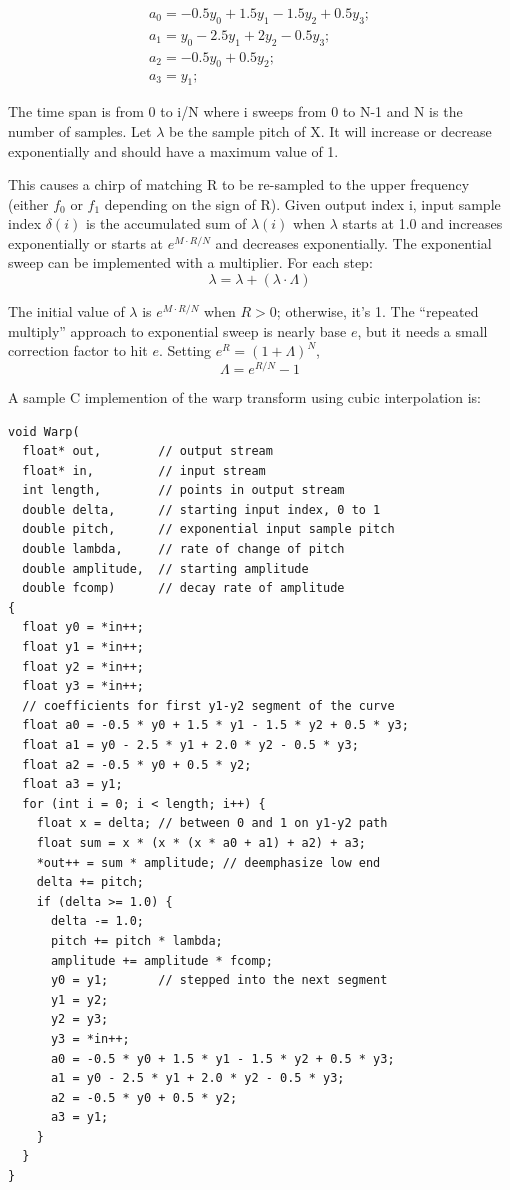 \begin{gather*} 
a_0 = -0.5y_0 + 1.5y_1 - 1.5y_2 + 0.5y_3;\\
a_1 = y_0 - 2.5y_1 + 2y_2 - 0.5y_3;\\
a_2 = -0.5y_0 + 0.5y_2;\\
a_3 = y_1;
\end{gather*}

The time span is from 0 to i/N where i sweeps from 0 to N-1 and N is the number
of samples.
Let $\lambda$ be the sample pitch of X.
It will increase or decrease exponentially and should have a maximum value of 1.

This causes a chirp of matching R to be re-sampled to the upper frequency
(either $f_0$ or $f_1$ depending on the sign of R).
Given output index i, input sample index $\delta(i)$ is the accumulated sum of
$\lambda(i)$ when $\lambda$ starts at 1.0 and increases exponentially
or starts at $e^{M \cdot R/N}$ and decreases exponentially.
The exponential sweep can be implemented with a multiplier.
For each step:
\begin{equation}  \label{eq:lambda}
\lambda = \lambda + (\lambda\cdot\Lambda)
\end{equation}

The initial value of $\lambda$ is $e^{M \cdot R/N}$ when $R>0$; otherwise, it's 1.
The ``repeated multiply'' approach to exponential sweep is nearly base $e$,
but it needs a small correction factor to hit $e$.
Setting $e^R = (1 + \Lambda)^N$,
\begin{equation}  \label{eq:lambdaApprox}
\Lambda = e^{R/N} - 1
\end{equation}

A sample C implemention of the warp transform using cubic interpolation is:

\begin{verbatim}
void Warp(
  float* out,        // output stream
  float* in,         // input stream
  int length,        // points in output stream
  double delta,      // starting input index, 0 to 1
  double pitch,      // exponential input sample pitch
  double lambda,     // rate of change of pitch
  double amplitude,  // starting amplitude
  double fcomp)      // decay rate of amplitude
{
  float y0 = *in++;
  float y1 = *in++;
  float y2 = *in++;
  float y3 = *in++;
  // coefficients for first y1-y2 segment of the curve
  float a0 = -0.5 * y0 + 1.5 * y1 - 1.5 * y2 + 0.5 * y3;
  float a1 = y0 - 2.5 * y1 + 2.0 * y2 - 0.5 * y3;
  float a2 = -0.5 * y0 + 0.5 * y2;
  float a3 = y1;
  for (int i = 0; i < length; i++) {
    float x = delta; // between 0 and 1 on y1-y2 path
    float sum = x * (x * (x * a0 + a1) + a2) + a3;
    *out++ = sum * amplitude; // deemphasize low end
    delta += pitch;
    if (delta >= 1.0) {
      delta -= 1.0;
      pitch += pitch * lambda;
      amplitude += amplitude * fcomp;
      y0 = y1;       // stepped into the next segment
      y1 = y2;
      y2 = y3;
      y3 = *in++;
      a0 = -0.5 * y0 + 1.5 * y1 - 1.5 * y2 + 0.5 * y3;
      a1 = y0 - 2.5 * y1 + 2.0 * y2 - 0.5 * y3;
      a2 = -0.5 * y0 + 0.5 * y2;
      a3 = y1;
    }
  }
}
\end{verbatim}

